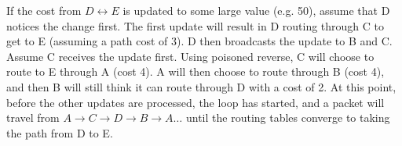 \documentclass[10pt,a4paper]{article}
\begin{document}
If the cost from $D \leftrightarrow E$ is updated to some large value (e.g. 50), assume that D notices the change first.
The first update will result in D routing through C to get to E (assuming a path cost of 3). D then broadcasts the update to B and C.
Assume C receives the update first. Using poisoned reverse, C will choose to route to E through A (cost 4). 
A will then choose to route through B (cost 4), and then B will still think it can route through D with a cost of 2.
At this point, before the other updates are processed, the loop has started, and a packet will travel from $A \rightarrow C \rightarrow D \rightarrow B \rightarrow A \ldots$ until the routing tables converge to taking the path from D to E.
\end{document}
